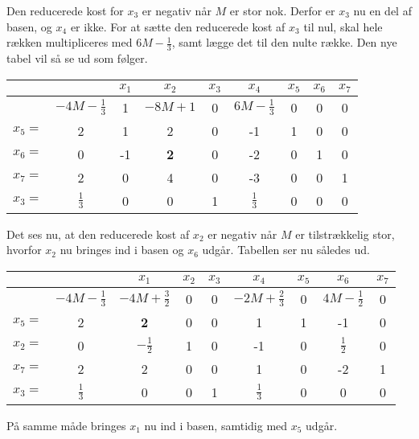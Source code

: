 \begin{eks}
Den reducerede kost for $x_3$ er negativ når $M$ er stor nok. 
Derfor er $x_3$ nu en del af basen, og $x_4$ er ikke. 
For at sætte den reducerede kost af $x_3$ til nul, skal hele rækken multipliceres med $6M- \frac{1}{3}$, samt lægge det til den nulte række. 
Den nye tabel vil så se ud som følger.

\begin{center}
\begin{tabular}{|c|c|ccccccc|}
\hline
	 &  & $x_1$ & $x_2$ & $x_3$ & $x_4$ & $x_5$ & $x_6$ & $x_7$ \\
\hline
	 & $-4M- \frac{1}{3}$ & 1 & $-8M+1$ & 0 & $6M- \frac{1}{3}$ & 0 & 0 & 0 \\
\hline
	$x_5=$ & 2 	  & 1  & 2		    & 0 & -1 & 1 & 0 & 0 \\
	$x_6=$ & 0 	  & -1 & \textbf{2} & 0 & -2 & 0 & 1 & 0 \\
	$x_7=$ & 2	  & 0  & 4 		 & 0 & -3 & 0 & 0 & 1 \\
	$x_3=$ & $\frac{1}{3}$ & 0 	 & 0 & 1  & $\frac{1}{3}$ & 0 & 0 & 0 \\
\hline
\end{tabular}
\end{center}

Det ses nu, at den reducerede kost af $x_2$ er negativ når $M$ er tilstrækkelig stor, hvorfor $x_2$ nu bringes ind i basen og $x_6$ udgår. 
Tabellen ser nu således ud.

\begin{center}
\begin{tabular}{|c|c|ccccccc|}
\hline
	 &  & $x_1$ & $x_2$ & $x_3$ & $x_4$ & $x_5$ & $x_6$ & $x_7$ \\
\hline
	 & $-4M- \frac{1}{3}$ & $-4M+ \frac{3}{2}$ & 0 & 0 & $-2M+ \frac{2}{3}$ & 0 & $4M- \frac{1}{2}$ & 0 \\
\hline
	$x_5=$ & 2 & \textbf{2} & 0 & 0 & 1 & 1 & -1 & 0 \\
	$x_2=$ & 0 & $- \frac{1}{2}$ & 1 & 0 & -1 & 0 & $\frac{1}{2}$ & 0 \\
	$x_7=$ & 2 & 2 & 0 & 0 & 1 & 0 & -2 & 1 \\
	$x_3=$ & $\frac{1}{3}$ & 0 & 0 & 1 & $\frac{1}{3}$ & 0 & 0 & 0 \\
\hline
\end{tabular}
\end{center}

På samme måde bringes $x_1$ nu ind i basen, samtidig med $x_5$ udgår. 


\end{eks}
